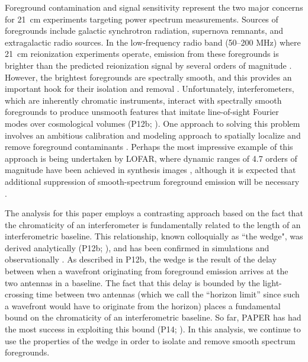 \documentclass[twocolumn,numberedappendix]{emulateapj} \shorttitle{PSA64}
\begin{document}
Foreground contamination and signal sensitivity represent the two major concerns for 21~cm
experiments targeting power spectrum measurements. Sources of foregrounds include
galactic synchrotron radiation, supernova remnants, and extragalactic radio sources.
In the low-frequency radio band (50--200 MHz) where 21~cm reionization
experiments operate, emission from these foregrounds is brighter than the
predicted reionization signal by several orders of magnitude
\citep{ghosh_et_al2011,bernardi_et_al2010,bernardi_et_al2009,ali_et_al2008,deoliveira2008,jelic_et_al2008,santos_et_al2005}.
However, the brightest foregrounds are spectrally smooth, and this provides an
important hook for their isolation and removal
\citep{liu_tegmark2012,petrovic_oh2011,liu_et_al2009}.  Unfortunately,
interferometers, which are inherently chromatic
instruments, interact with spectrally smooth foregrounds to produce unsmooth features that
imitate line-of-sight Fourier modes over cosmological volumes (P12b; \citealt{bowman_et_al2009,morales_et_al2006a}).
One approach to solving this problem involves an ambitious calibration and modeling approach to spatially localize and
remove foreground contaminants \citep{chapman_et_al2013,sullivan_et_al2012,harker_et_al2009,liu_et_al2008,bowman_et_al2008}.
Perhaps the most impressive example of this approach is being undertaken by LOFAR, where dynamic ranges of 4.7 
orders of magnitude have
been achieved in synthesis images \citep{yatawatta_et_al2013}, although it is expected that additional
suppression of smooth-spectrum foreground emission will be necessary \citep{chapman_et_al2013}.

The analysis for this paper employs a contrasting
approach based on the fact that the chromaticity of an interferometer
is fundamentally related to the length of an interferometric baseline.  This relationship, known
colloquially as ``the wedge", was 
derived analytically (P12b; \citealt{vedantham_et_al2012}), and has been confirmed in 
simulations \citep{datta_et_al2010,hazelton_et_al2013} and observationally
\citep{pober_et_al2013,dillon_et_al2013b}.  As described in P12b, the wedge is the result of the delay
between when a wavefront originating from foreground emission
arrives at the two antennas in a baseline.  The fact that this delay is bounded by the light-crossing
time between two antennas (which we call the ``horizon limit'' since such a wavefront would have to 
originate from the horizon) places a fundamental bound on the chromaticity of
an interferometric baseline.  So far, PAPER has had the most success in exploiting this bound
(P14; \citealt{jacobs_et_al2014}). 
In this analysis, we continue to use the properties of the 
wedge in order to isolate and remove smooth
spectrum foregrounds.
\end{document}
